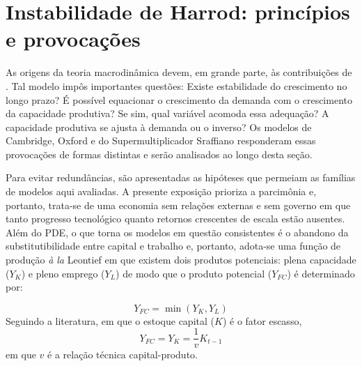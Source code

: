 
\section{Instabilidade de Harrod: princípios e provocações}\label{SecHarrod}


As origens da teoria macrodinâmica devem, em grande parte, às contribuições de \textcite{harrod_essay_1939}. Tal modelo impôs importantes questões: Existe estabilidade do crescimento no longo pra\-zo? É possível equacionar o crescimento da demanda com o crescimento da capacidade produtiva? Se sim, qual variável acomoda essa adequação? A capacidade produtiva se ajusta à demanda ou o inverso? Os modelos de Cambridge, Oxford e do Supermultiplicador Sraffiano responderam essas provocações de formas distintas e serão analisados ao longo desta seção.


Para evitar redundâncias, são apresentadas as hipóteses que permeiam as famílias de modelos aqui avaliadas. 
A presente exposição prioriza a parcimônia e, portanto, trata-se de uma economia sem relações externas e sem governo em que tanto progresso tecnológico quanto retornos crescentes de escala estão ausentes. Além do PDE, o que torna os modelos em questão consistentes
é o abandono da substitutibilidade entre capital e trabalho e, portanto, adota-se uma função de produção
\textit{à la} Leontief em que existem dois produtos potenciais: plena capacidade ($Y_K$) e pleno emprego ($Y_L$) de modo que o produto potencial ($Y_{FC}$) é determinado por:

\begin{equation}
    Y_{FC} = \min (Y_K, Y_L)
\end{equation}
Seguindo a literatura, em que o estoque capital ($K$) é o fator escasso,
\begin{equation}
\label{Oferta}
    Y_{FC} = Y_K = \frac{1}{v}K_{t-1}
\end{equation}
em que $v$ é a relação técnica capital-produto. 


